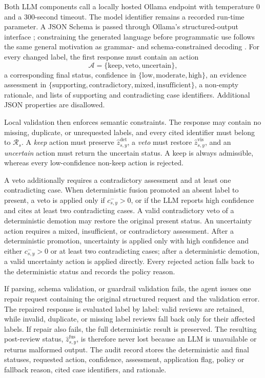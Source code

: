 Both LLM components call a locally hosted Ollama endpoint with temperature $0$ and a 300-second timeout. The model identifier remains a recorded run-time parameter. A JSON Schema is passed through Ollama's structured-output interface \cite{ollama2024structured}; constraining the generated language before programmatic use follows the same general motivation as grammar- and schema-constrained decoding \cite{scholak2021picard}. For every changed label, the first response must contain an action
\[
\mathcal A=\{\mathrm{keep},\mathrm{veto},\mathrm{uncertain}\},
\]
a corresponding final status, confidence in $\{\mathrm{low},\mathrm{moderate},\mathrm{high}\}$, an evidence assessment in $\{\mathrm{supporting},\mathrm{contradictory},\mathrm{mixed},\mathrm{insufficient}\}$, a non-empty rationale, and lists of supporting and contradicting case identifiers. Additional JSON properties are disallowed.

Local validation then enforces semantic constraints. The response may contain no missing, duplicate, or unrequested labels, and every cited identifier must belong to $\mathcal R_s$. A \emph{keep} action must preserve $\widehat z^{\mathrm{det}}_{s,y}$, a \emph{veto} must restore $\widehat z^{\mathrm{vis}}_{s,y}$, and an \emph{uncertain} action must return the uncertain status. A keep is always admissible, whereas every low-confidence non-keep action is rejected.

A veto additionally requires a contradictory assessment and at least one contradicting case. When deterministic fusion promoted an absent label to present, a veto is applied only if $c^-_{s,y}>0$, or if the LLM reports high confidence and cites at least two contradicting cases. A valid contradictory veto of a deterministic demotion may restore the original present status. An uncertainty action requires a mixed, insufficient, or contradictory assessment. After a deterministic promotion, uncertainty is applied only with high confidence and either $c^-_{s,y}>0$ or at least two contradicting cases; after a deterministic demotion, a valid uncertainty action is applied directly. Every rejected action falls back to the deterministic status and records the policy reason.

If parsing, schema validation, or guardrail validation fails, the agent issues one repair request containing the original structured request and the validation error. The repaired response is evaluated label by label: valid reviews are retained, while invalid, duplicate, or missing label reviews fall back only for their affected labels. If repair also fails, the full deterministic result is preserved. The resulting post-review status, $\widehat z^{\mathrm{fus}}_{s,y}$, is therefore never lost because an LLM is unavailable or returns malformed output. The audit record stores the deterministic and final statuses, requested action, confidence, assessment, application flag, policy or fallback reason, cited case identifiers, and rationale.

